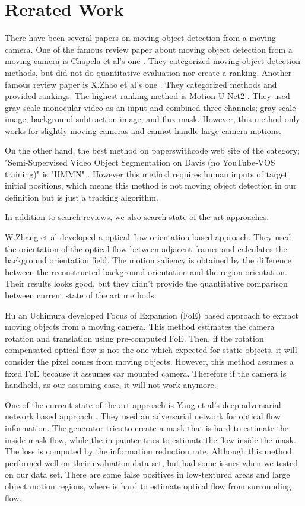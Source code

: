 \documentclass[10pt, twocolumn]{article}
\begin{document}
\section{Rerated Work}
There have been several papers on moving object detection from a moving camera.
One of the famous review paper about moving object detection from a moving camera is Chapela et al's one \cite{chapel2020moving}.
They categorized moving object detection methods, but did not do quantitative evaluation nor create a ranking.
Another famous review paper is X.Zhao et al's one \cite{ZHAO202228}.
They categorized methods and provided rankings.
The highest-ranking method is Motion U-Net2 \cite{DBLP:conf/icpr/RahmonBSP20}.
They used gray scale monocular video as an input and combined three channels; gray scale image, background subtraction image, and flux mask.
However, this method only works for slightly moving cameras and cannot handle large camera motions.

On the other hand, the best method on paperswithcode web site of the category; "Semi-Supervised Video Object Segmentation on Davis (no YouTube-VOS training)" is "HMMN" \cite{DBLP:journals/corr/abs-2109-11404}.
However this method requires human inputs of target initial positions, which means this method is not moving object detection in our definition but is just a tracking algorithm.

In addition to search reviews, we also search state of the art approaches.

W.Zhang et al \cite{Zhang_Sun_Yu_2020} developed a optical flow orientation based approach.
They used the orientation of the optical flow between adjacent frames and calculates the background orientation field.
The motion saliency is obtained by the difference between the reconstructed background orientation and the region orientation.
Their results looks good, but they didn't provide the quantitative comparison between current state of the art methods.

Hu an Uchimura \cite{hu2000} developed Focus of Expansion (FoE) based approach to extract moving objects from a moving camera.
This method estimates the camera rotation and translation using pre-computed FoE.
Then, if the rotation compensated optical flow is not the one which expected for static objects, it will consider the pixel comes from moving objects.
However, this method assumes a fixed FoE because it assumes car mounted camera.
Therefore if the camera is handheld, as our assuming case, it will not work anymore.

One of the current state-of-the-art approach is Yang et al's deep adversarial network based approach \cite{yang_loquercio_2019}.
They used an adversarial network for optical flow information.
The generator tries to create a mask that is hard to estimate the inside mask flow, while the in-painter tries to estimate the flow inside the mask.
The loss is computed by the information reduction rate.
Although this method performed well on their evaluation data set, but had some issues when we tested on our data set.
There are some false positives in low-textured areas and large object motion regions, where is hard to estimate optical flow from surrounding flow.
\end{document}

